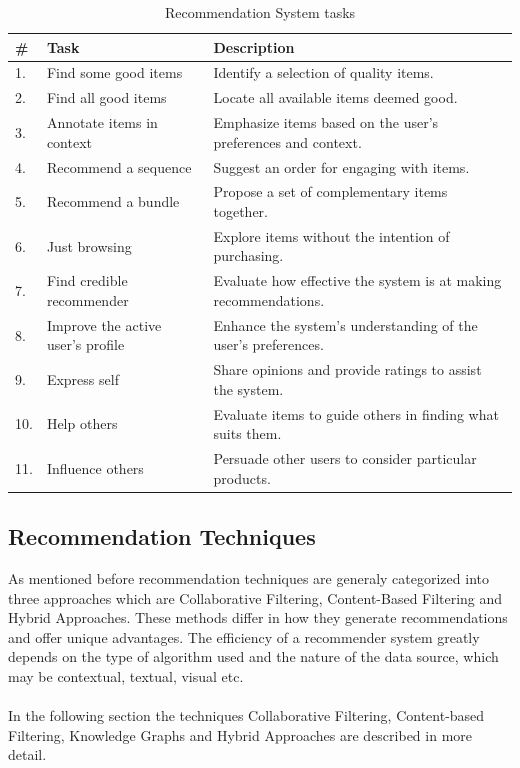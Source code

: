 \documentclass[\myFontSize,oneside,english,hidelinks,a4paper]{article}
\begin{document}
\begin{table}[h!]
\centering
{
\renewcommand{\arraystretch}{2}
{\large
\begin{tabular}{|m{}|m{}|m{}|}
\hline
\textbf{\#} & \textbf{Task} & \textbf{Description} \\ \hline
1. & Find some good items & Identify a selection of quality items. \\ \hline
2. & Find all good items & Locate all available items deemed good. \\ \hline
3. & Annotate items in context & Emphasize items based on the user's preferences and context. \\ \hline
4. & Recommend a sequence & Suggest an order for engaging with items. \\ \hline
5. & Recommend a bundle & Propose a set of complementary items together. \\ \hline
6. & Just browsing & Explore items without the intention of purchasing. \\ \hline
7. & Find credible recommender & Evaluate how effective the system is at making recommendations. \\ \hline
8. & Improve the active user's profile & Enhance the system's understanding of the user's preferences. \\ \hline
9. & Express self & Share opinions and provide ratings to assist the system. \\ \hline
10. & Help others & Evaluate items to guide others in finding what suits them. \\ \hline
11. & Influence others & Persuade other users to consider particular products. \\ \hline
\end{tabular}
}
}
\caption{Recommendation System tasks}
\label{table:rs-tasks}
\end{table}

\clearpage

\subsection{Recommendation Techniques}
As mentioned before recommendation techniques are generaly categorized into three approaches which are Collaborative Filtering, Content-Based Filtering and Hybrid Approaches. These methods differ in how they generate recommendations and offer unique advantages. The efficiency of a recommender system greatly depends on the type of algorithm used and the nature of the data source, which may be contextual, textual, visual etc. \cite{Roy2022}\\\\
In the following section the techniques Collaborative Filtering, Content-based Filtering, Knowledge Graphs and Hybrid Approaches are described in more detail.\\
%
\end{document}
